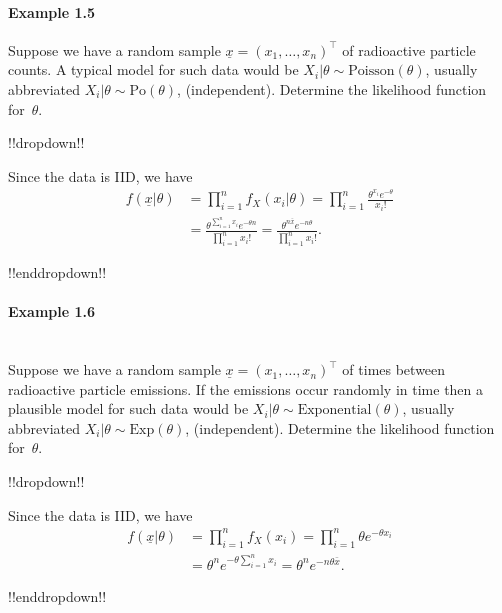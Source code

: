\clearpage

\paragraph{Example 1.5}{Suppose we have a random sample $\underline{x} = (x_1, \ldots, x_n)^\top$ of radioactive particle counts. A typical model for such data would be $X_i|\theta\sim \mathrm{Poisson}(\theta)$, usually abbreviated $X_{i}|\theta\sim\mathrm{Po}(\theta)$, (independent). Determine the likelihood function for~$\theta$.

!!dropdown!!

Since the data is IID, we have
        \begin{align*}
            f(\underline{x}|\theta) &= \prod_{i=1}^n f_{X}(x_i|\theta) = \prod_{i=1}^n \frac{\theta^{x_i} e^{-\theta}}{x_i!} \\
            &= \frac{\theta^{\sum_{i=1}^n x_i} e^{-\theta n}}{\prod_{i=1}^n x_i!} = \frac{\theta^{n\bar{x}} e^{-n\theta}}{\prod_{i=1}^n x_i!}.
        \end{align*}

!!enddropdown!!

\label{ex:poissonex}}

\paragraph{Example 1.6}{~\\
Suppose we have a random sample $\underline{x} = (x_1, \ldots, x_n)^\top$ of times between radioactive particle emissions. If the emissions occur randomly in time then a plausible model for such data would be $X_i|\theta\sim \mathrm{Exponential}(\theta)$, usually abbreviated $X_{i}|\theta \sim \mathrm{Exp}(\theta)$, (independent). Determine the likelihood function for~$\theta$.

!!dropdown!!

Since the data is IID, we have
        \begin{align*}
            f(\underline{x}|\theta) &= \prod_{i=1}^n f_{X}(x_i) = \prod_{i=1}^n \theta e^{-\theta x_i} \\
            &= \theta^n e^{-\theta \sum_{i=1}^n x_i} = \theta^n e^{- n \theta \bar{x}}.
        \end{align*}

!!enddropdown!!}

\clearpage

